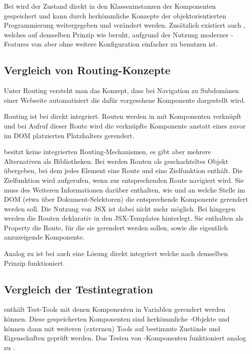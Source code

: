 Bei  wird der Zustand direkt in den Klasseninstanzen der Komponenten gespeichert und kann durch herkömmliche Konzepte der objektorientierten Programmierung weitergegeben und verändert werden. Zusätzlich existiert auch , welches auf demselben Prinzip wie  beruht, aufgrund der Nutzung moderner -Features von  aber ohne weitere Konfiguration einfacher zu benutzen ist.

\subsection{Vergleich von Routing-Konzepte}
Unter Routing versteht man das Konzept, dass bei Navigation zu Subdomänen einer Webseite automatisiert die dafür vorgesehene Komponente dargestellt wird.

Routing ist bei  direkt integriert. Routen werden in  mit Komponenten verknüpft und bei Aufruf dieser Route wird die verknüpfte Komponente anstatt eines zuvor im DOM platzierten Platzhalters gerendert.

 besitzt keine integrierten Routing-Mechanismen, es gibt aber mehrere Alternativen als Bibliotheken. Bei  werden Routen als geschachteltes Objekt\\ übergeben, bei dem jedes Element eine Route und eine Zielfunktion enthält. Die Zielfunktion wird aufgerufen, wenn zur entsprechenden Route navigiert wird. Sie muss des Weiteren Informationen darüber enthalten, wie und an welche Stelle im DOM (etwa über Dokument-Selektoren) die entsprechende Komponente gerendert werden soll. Die Nutzung von JSX ist dabei nicht mehr möglich. Bei  hingegen werden die Routen deklarativ in den JSX-Templates hinterlegt. Sie enthalten als Property die Route, für die sie gerendert werden sollen, sowie die eigentlich anzuzeigende Komponente.

Analog zu  ist bei  auch eine Lösung direkt integriert welche nach demselben Prinzip funktioniert.

\subsection{Vergleich der Testintegration}
 enthält Test-Tools mit denen Komponenten in Variablen gerendert werden können. Diese gespeicherten Komponenten sind herkömmliche -Objekte und können dann mit weiteren (externen) Tools auf bestimmte Zustände und Eigenschaften geprüft werden. Das Testen von -Komponenten funktioniert analog zu .

